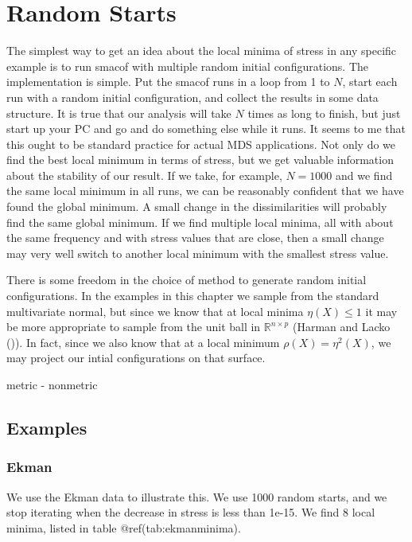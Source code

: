 \documentclass[
  12pt,
  letterpaper,
  DIV=11,
  numbers=noendperiod]{scrreprt}
\theoremstyle{remark}
\begin{document}
\section{Random Starts}\label{random-starts}

The simplest way to get an idea about the local minima of stress in any
specific example is to run smacof with multiple random initial
configurations. The implementation is simple. Put the smacof runs in a
loop from 1 to \(N\), start each run with a random initial
configuration, and collect the results in some data structure. It is
true that our analysis will take \(N\) times as long to finish, but just
start up your PC and go and do something else while it runs. It seems to
me that this ought to be standard practice for actual MDS applications.
Not only do we find the best local minimum in terms of stress, but we
get valuable information about the stability of our result. If we take,
for example, \(N=1000\) and we find the same local minimum in all runs,
we can be reasonably confident that we have found the global minimum. A
small change in the dissimilarities will probably find the same global
minimum. If we find multiple local minima, all with about the same
frequency and with stress values that are close, then a small change may
very well switch to another local minimum with the smallest stress
value.

There is some freedom in the choice of method to generate random initial
configurations. In the examples in this chapter we sample from the
standard multivariate normal, but since we know that at local minima
\(\eta(X)\leq 1\) it may be more appropriate to sample from the unit
ball in \(\mathbb{R}^{n\times p}\) (Harman and Lacko
()). In fact, since we also know
that at a local minimum \(\rho(X)=\eta^2(X)\), we may project our intial
configurations on that surface.

metric - nonmetric

\subsection{Examples}\label{examples-3}

\subsubsection{Ekman}\label{ekman}

We use the Ekman data to illustrate this. We use 1000 random starts, and
we stop iterating when the decrease in stress is less than 1e-15. We
find 8 local minima, listed in table @ref(tab:ekmanminima).
\end{document}
